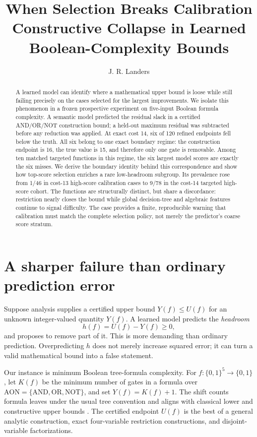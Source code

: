 \documentclass[11pt]{article}
\title{\vspace{-1.7em}\textbf{When Selection Breaks Calibration}\\[-1pt]
\large Constructive Collapse in Learned Boolean-Complexity Bounds}
\author{J. R. Landers}
\date{\vspace{-1.4em}}
\newcommand{\AON}{\mathrm{AON}}
\begin{document}
\maketitle
\vspace{-1.6em}

\begin{abstract}
A learned model can identify where a mathematical upper bound is loose while
still failing precisely on the cases selected for the largest improvements.
We isolate this phenomenon in a frozen prospective experiment on five-input
Boolean formula complexity.  A semantic model predicted the residual slack in
a certified AND/OR/NOT construction bound; a held-out maximum residual was
subtracted before any reduction was applied.  At exact cost 14, six of 120
refined endpoints fell below the truth.  All six belong to one exact boundary
regime: the construction endpoint is 16, the true value is 15, and therefore
only one gate is removable.  Among ten matched targeted functions in this
regime, the six largest model scores are exactly the six misses.  We derive
the boundary identity behind this correspondence and show how top-score
selection enriches a rare low-headroom subgroup.  Its prevalence rose from
1/46 in cost-13 high-score calibration cases to 9/78 in the cost-14 targeted
high-score cohort.  The functions are structurally distinct, but share a
discordance: restriction nearly closes the bound while global decision-tree
and algebraic features continue to signal difficulty.  The case provides a
finite, reproducible warning that calibration must match the complete
selection policy, not merely the predictor's coarse score stratum.
\end{abstract}

\section{A sharper failure than ordinary prediction error}

Suppose analysis supplies a certified upper bound $Y(f)\le U(f)$ for an
unknown integer-valued quantity $Y(f)$.  A learned model predicts the
\emph{headroom}
\[
 h(f)=U(f)-Y(f)\ge0,
\]
and proposes to remove part of it.  This is more demanding than ordinary
prediction.  Overpredicting $h$ does not merely increase squared error; it can
turn a valid mathematical bound into a false statement.

Our instance is minimum Boolean tree-formula complexity.  For
$f:\{0,1\}^5\to\{0,1\}$, let $K(f)$ be the minimum number of gates in a
formula over $\AON=\{\mathrm{AND},\mathrm{OR},\mathrm{NOT}\}$, and set
$Y(f)=K(f)+1$.  The shift counts formula leaves under the usual tree
convention and aligns with classical lower and constructive upper bounds
\cite{jukna2012}.  The certified endpoint $U(f)$ is the best of a general
analytic construction, exact four-variable restriction constructions, and
disjoint-variable factorizations.
\end{document}

